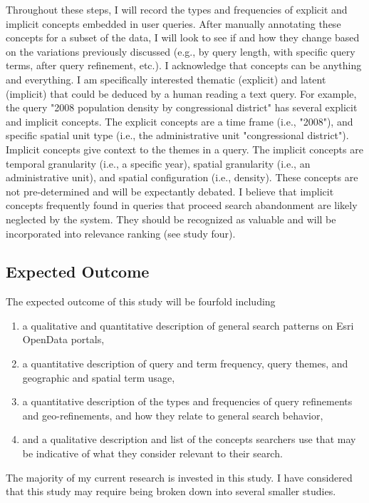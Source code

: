 Throughout these steps, I will record the types and frequencies of explicit and implicit concepts embedded in user queries. After manually annotating these concepts for a subset of the data, I will look to see if and how they change based on the variations previously discussed (e.g., by query length, with specific query terms, after query refinement, etc.). I acknowledge that concepts can be anything and everything. I am specifically interested thematic (explicit) and latent (implicit) that could be deduced by a human reading a text query. For example, the query "2008 population density by congressional district" has several explicit and implicit concepts. The explicit concepts are a time frame (i.e., "2008"), and specific spatial unit type (i.e., the administrative unit "congressional district"). Implicit concepts give context to the themes in a query. The implicit concepts are temporal granularity (i.e., a specific year), spatial granularity (i.e., an administrative unit), and spatial configuration (i.e., density). These concepts are not pre-determined and will be expectantly debated. I believe that implicit concepts frequently found in queries that proceed search abandonment are likely neglected by the system. They should be recognized as valuable and will be incorporated into relevance ranking (see study four).

\subsection{Expected Outcome}
The expected outcome of this study will be fourfold including 
\begin{enumerate}
    \item a qualitative and quantitative description of general search patterns on Esri OpenData portals,
    \item a quantitative description of query and term frequency, query themes, and geographic and spatial term usage,
    \item a quantitative description of the types and frequencies of query refinements and geo-refinements, and how they relate to general search behavior,
    \item and a qualitative description and list of the concepts searchers use that may be indicative of what they consider relevant to their search.
\end{enumerate}

The majority of my current research is invested in this study. I have considered that this study may require being broken down into several smaller studies.

